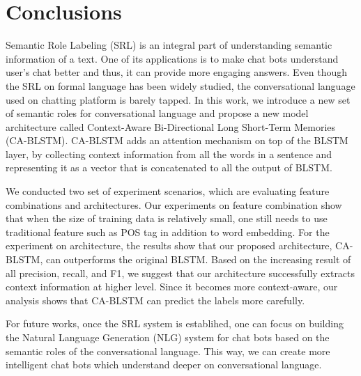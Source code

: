 \section{Conclusions}
Semantic Role Labeling (SRL) is an integral part of understanding semantic information of a text. One of its applications is to make chat bots understand user's chat better and thus, it can provide more engaging answers. Even though the SRL on formal language has been widely studied, the conversational language used on chatting platform is barely tapped. In this work, we introduce a new set of semantic roles for conversational language and propose a new model architecture called Context-Aware Bi-Directional Long Short-Term Memories (CA-BLSTM). CA-BLSTM adds an attention mechanism on top of the BLSTM layer, by collecting context information from all the words in a sentence and representing it as a vector that is concatenated to all the output of BLSTM.

We conducted two set of experiment scenarios, which are evaluating feature combinations and architectures. Our experiments on feature combination show that when the size of training data is relatively small, one still needs to use traditional feature such as POS tag in addition to word embedding. For the experiment on architecture, the results show that our proposed architecture, CA-BLSTM, can outperforms the original BLSTM. Based on the increasing result of all precision, recall, and F1, we suggest that our architecture successfully extracts context information at higher level. Since it becomes more context-aware, our analysis shows that CA-BLSTM can predict the labels more carefully.

For future works, once the SRL system is establihed, one can focus on building the Natural Language Generation (NLG) system for chat bots based on the semantic roles of the conversational language. This way, we can create more intelligent chat bots which understand deeper on conversational language.

